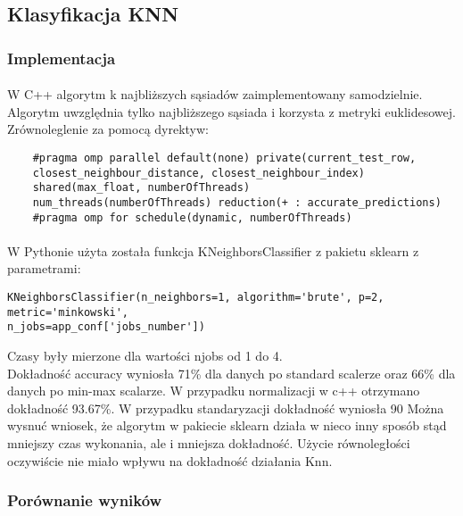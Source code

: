 \documentclass[a4paper,11pt]{article}
\begin{document}
\subsection{Klasyfikacja KNN} 
\subsubsection{Implementacja} 
\paragraph{}W C++ algorytm k najbliższych sąsiadów zaimplementowany samodzielnie. Algorytm uwzględnia tylko najbliższego sąsiada i korzysta z metryki euklidesowej. Zrównoleglenie za pomocą dyrektyw:
\begin{lstlisting}
    #pragma omp parallel default(none) private(current_test_row, 
    closest_neighbour_distance, closest_neighbour_index) 
    shared(max_float, numberOfThreads)
    num_threads(numberOfThreads) reduction(+ : accurate_predictions)
    #pragma omp for schedule(dynamic, numberOfThreads)
\end{lstlisting}

\paragraph{}W Pythonie użyta została funkcja KNeighborsClassifier z pakietu sklearn z parametrami:
\begin{lstlisting}
KNeighborsClassifier(n_neighbors=1, algorithm='brute', p=2, metric='minkowski',
n_jobs=app_conf['jobs_number'])
\end{lstlisting}
Czasy były mierzone dla wartości njobs od 1 do 4. \\
Dokładność accuracy wyniosła 71\% dla danych po standard scalerze oraz 66\% dla danych po min-max scalarze.  
W przypadku normalizacji w c++ otrzymano dokładność 93.67\%. W przypadku standaryzacji dokładność wyniosła 90%
Można wysnuć wniosek, że algorytm w pakiecie sklearn działa w nieco inny sposób stąd mniejszy czas wykonania, ale i mniejsza dokładność. Użycie równoległości oczywiście nie miało wpływu na dokładność działania Knn.
\subsubsection{Porównanie wyników} 
\end{document}
